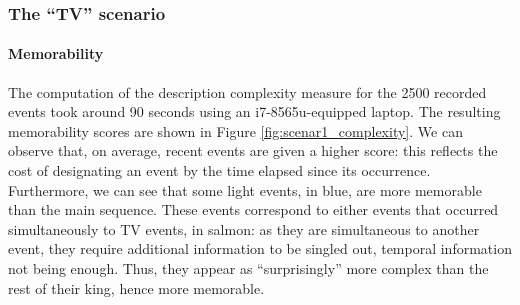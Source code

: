 \documentclass[entropy,article,submit,moreauthors,pdftex]{Definitions/mdpi}
\begin{document}


\subsubsection{The ``TV'' scenario}
\paragraph{Memorability}

The computation of the description complexity measure for the 2500 recorded events took around 90 seconds using an i7-8565u-equipped laptop. The resulting memorability scores are shown in Figure \ref{fig:scenar1_complexity}. We can observe that, on average, recent events are given a higher score: this reflects the cost of designating an event by the time elapsed since its occurrence. Furthermore, we can see that some light events, in blue, are more memorable than the main sequence. These events correspond to either events that occurred simultaneously to TV events, in salmon: as they are simultaneous to another event, they require additional information to be singled out, temporal information not being enough. Thus, they appear as ``surprisingly'' more complex than the rest of their king, hence more memorable. 
\end{document}
